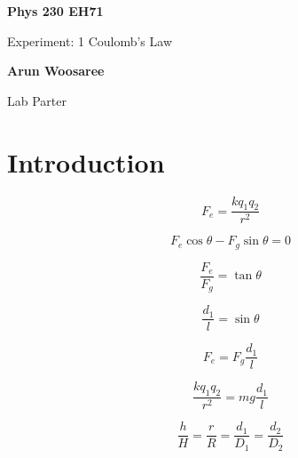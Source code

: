\documentclass{article}
\begin{document}
  \begin{titlepage}
    \begin{center}
        \vspace*{1cm}

        \Huge
        \textbf{Phys 230 EH71}

        \huge
        \vspace{.5cm}
        Experiment: 1 Coulomb's Law

        \LARGE
        \vspace{1cm}

        \textbf{Arun Woosaree}

        \vspace{.5cm}
        Lab Parter

        \vfill
    \end{center}
\end{titlepage}

\section{Introduction}

\begin{equation}
  F_e=\frac{k q_1 q_2}{r^2}
\end{equation}

\begin{equation}
  F_e \cos\theta - F_g \sin\theta=0
\end{equation}

\begin{equation}
  \frac{F_e}{F_g} = \tan\theta
\end{equation}

\begin{equation}
  \frac{d_1}{l}=\sin\theta
\end{equation}

\begin{equation}
  F_e=F_g\frac{d_1}{l}
\end{equation}

\begin{equation}
  \frac{k q_1 q_2}{r^2}=mg\frac{d_1}{l}
\end{equation}

\begin{equation}
  \frac{h}{H}=\frac{r}{R}=\frac{d_1}{D_1}=\frac{d_2}{D_2}
\end{equation}
\end{document}
